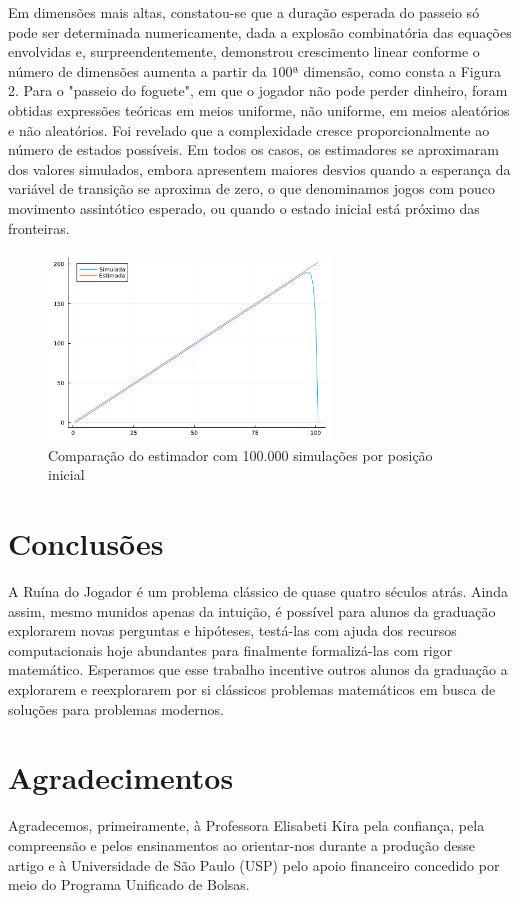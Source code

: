 \documentclass[a4paper,10pt,twocolumn]{article}
\begin{document}
Em dimensões mais altas, constatou-se que a duração esperada do
passeio só pode ser determinada numericamente, dada a explosão combinatória das
equações envolvidas e, surpreendentemente, demonstrou crescimento linear
conforme o número de dimensões aumenta a partir da $100$ª dimensão, como consta a
Figura 2. Para o "passeio do foguete", em que o jogador não pode perder
dinheiro, foram obtidas expressões teóricas em meios uniforme, não uniforme, em
meios aleatórios e não aleatórios. Foi revelado que a complexidade cresce
proporcionalmente ao número de estados possíveis. Em todos os casos, os
estimadores se aproximaram dos valores simulados, embora apresentem maiores
desvios quando a esperança da variável de transição se aproxima de zero, o que
denominamos jogos com pouco movimento assintótico esperado, ou quando o estado
inicial está próximo das fronteiras.

\begin{figure}[b!]
    \caption{Comparação do estimador com 100.000 simulações por posição inicial}
    \centering
    \includegraphics[width=7.5cm]{"graficoest.pdf"}
\end{figure}

\section{Conclusões}

A Ruína do Jogador é um problema clássico de quase quatro séculos atrás. Ainda
assim, mesmo munidos apenas da intuição, é possível para alunos da graduação
explorarem novas perguntas e hipóteses, testá-las com ajuda dos recursos
computacionais hoje abundantes para finalmente formalizá-las com rigor
matemático. Esperamos que esse trabalho incentive outros alunos da graduação a
explorarem e reexplorarem por si clássicos problemas matemáticos em busca de
soluções para problemas modernos.

\section{Agradecimentos}

Agradecemos, primeiramente, à Professora Elisabeti Kira pela confiança, pela
compreensão e pelos ensinamentos ao orientar-nos durante a produção desse artigo
e à Universidade de São Paulo (USP) pelo apoio financeiro concedido por meio do
Programa Unificado de Bolsas.

\vspace{2.5pt}


\end{document}
